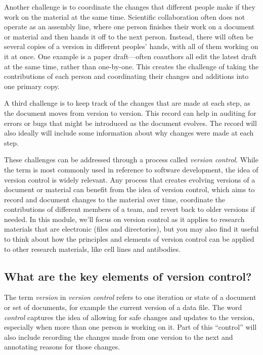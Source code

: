 \documentclass[]{tufte-book}
\begin{document}
Another challenge is to coordinate the changes that different people make if
they work on the material at the same time. Scientific collaboration often does
not operate as an assembly line, where one person finishes their work on a
document or material and then hands it off to the next person. Instead, there
will often be several copies of a version in different peoples' hands, with all
of them working on it at once. One example is a paper draft---often coauthors
all edit the latest draft at the same time, rather than one-by-one.
This creates the challenge of taking the contributions of each person and
coordinating their changes and additions into one primary copy.

A third challenge is to keep track of the changes that are made at each step,
as the document moves from version to version. This record can help in auditing
for errors or bugs that might be introduced as the document evolves. The record will
also ideally will include some information about why changes were made at each
step.

These challenges can be addressed through a process called \emph{version control}.
While the term is most commonly used in reference to software development, the
idea of version control is widely relevant. Any process that creates evolving
versions of a document or material can benefit from the idea of version control,
which aims to record and document changes to the material over time, coordinate
the contributions of different members of a team, and revert back to older
versions if needed. In this module, we'll focus on version control as it applies
to research materials that are electronic (files and directories), but you may
also find it useful to think about how the principles and elements of version
control can be applied to other research materials, like cell lines and
antibodies.

\subsection{What are the key elements of version control?}\label{what-are-the-key-elements-of-version-control}

The term \emph{version} in \emph{version control} refers to one iteration or state of a
document or set of documents, for example the current version of a data file.
The word \emph{control} captures the idea of allowing for safe changes and updates to
the version, especially when more than one person is working on it. Part of this
``control'' will also include recording the changes made from one version to the
next and annotating reasons for those changes.
\end{document}
